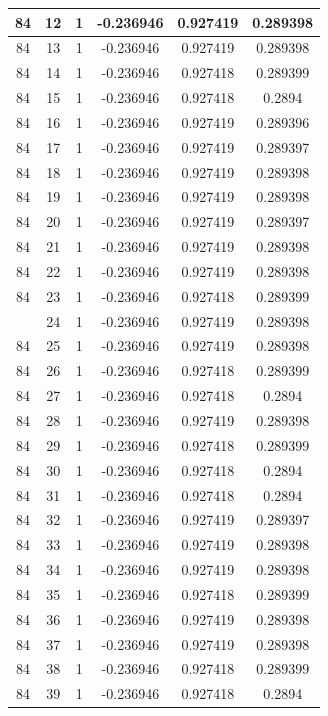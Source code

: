 \documentclass[12pt,a4paper]{article}
\numberwithin{equation}{section}
\numberwithin{figure}{section}
\numberwithin{table}{section}
\begin{document}
\begin{longtable}{|c|c|c|c|c|c|}
84 & 12 & 1 & -0.236946 & 0.927419 & 0.289398 \\ \hline
84 & 13 & 1 & -0.236946 & 0.927419 & 0.289398 \\ \hline
84 & 14 & 1 & -0.236946 & 0.927418 & 0.289399 \\ \hline
84 & 15 & 1 & -0.236946 & 0.927418 & 0.2894 \\ \hline
84 & 16 & 1 & -0.236946 & 0.927419 & 0.289396 \\ \hline
84 & 17 & 1 & -0.236946 & 0.927419 & 0.289397 \\ \hline
84 & 18 & 1 & -0.236946 & 0.927419 & 0.289398 \\ \hline
84 & 19 & 1 & -0.236946 & 0.927419 & 0.289398 \\ \hline
84 & 20 & 1 & -0.236946 & 0.927419 & 0.289397 \\ \hline
84 & 21 & 1 & -0.236946 & 0.927419 & 0.289398 \\ \hline
84 & 22 & 1 & -0.236946 & 0.927419 & 0.289398 \\ \hline
84 & 23 & 1 & -0.236946 & 0.927418 & 0.289399 \\ \hline
\pagebreak
84 & 24 & 1 & -0.236946 & 0.927419 & 0.289398 \\ \hline
84 & 25 & 1 & -0.236946 & 0.927419 & 0.289398 \\ \hline
84 & 26 & 1 & -0.236946 & 0.927418 & 0.289399 \\ \hline
84 & 27 & 1 & -0.236946 & 0.927418 & 0.2894 \\ \hline
84 & 28 & 1 & -0.236946 & 0.927419 & 0.289398 \\ \hline
84 & 29 & 1 & -0.236946 & 0.927418 & 0.289399 \\ \hline
84 & 30 & 1 & -0.236946 & 0.927418 & 0.2894 \\ \hline
84 & 31 & 1 & -0.236946 & 0.927418 & 0.2894 \\ \hline
84 & 32 & 1 & -0.236946 & 0.927419 & 0.289397 \\ \hline
84 & 33 & 1 & -0.236946 & 0.927419 & 0.289398 \\ \hline
84 & 34 & 1 & -0.236946 & 0.927419 & 0.289398 \\ \hline
84 & 35 & 1 & -0.236946 & 0.927418 & 0.289399 \\ \hline
84 & 36 & 1 & -0.236946 & 0.927419 & 0.289398 \\ \hline
84 & 37 & 1 & -0.236946 & 0.927419 & 0.289398 \\ \hline
84 & 38 & 1 & -0.236946 & 0.927418 & 0.289399 \\ \hline
84 & 39 & 1 & -0.236946 & 0.927418 & 0.2894 \\ \hline

\end{longtable}
\end{document}
